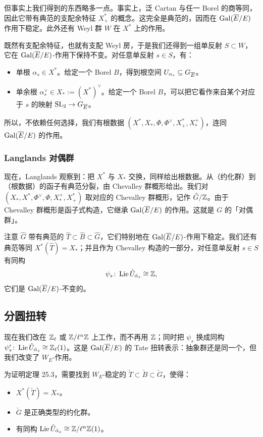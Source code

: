 但事实上我们得到的东西略多一点。事实上，泛 Cartan 与任一 Borel 的商等同，因此它带有典范的支配余特征 $X^*_+$ 的概念。这完全是典范的，因而在 $\operatorname{Gal}(\overline{E}/E)$ 作用下稳定。此外还有 Weyl 群 $W$ 在 $X^*$ 上的作用。

既然有支配余特征，也就有支配 Weyl 房，于是我们还得到一组单反射 $S\subset W$，它在 $\operatorname{Gal}(\overline{E}/E)$-作用下保持不变。对任意单反射 $s\in S$，有：
\begin{itemize}
\item 单根 $\alpha_s\in X^*$。给定一个 Borel $B$，得到根空间 $U_{\alpha_s}\subseteq G_{\overline{E}}$。
\item 单余根 $\alpha_s^\vee\in X_*:=(X^*)^\vee$。给定一个 Borel $B$，可以把它看作来自某个对应于 $s$ 的映射 $\mathrm{SL}_2\to G_{\overline{E}}$。
\end{itemize}
所以，不依赖任何选择，我们有根数据 $(X^*,X_*,\Phi,\Phi^\vee,X^*_+,X^+_*)$，连同 $\operatorname{Gal}(\overline{E}/E)$ 的作用。

\subsubsection{Langlands 对偶群}

现在，Langlands 观察到：把 $X^*$ 与 $X_*$ 交换，同样给出根数据。从（约化群）到（根数据）的函子有典范分裂，由 Chevalley 群概形给出。我们对 $(X_*,X^*,\Phi^\vee,\Phi,X^+_*,X^*_+)$ 取对应的 Chevalley 群概形，记作 $\hat G/\mathbb{Z}$。由于 Chevalley 群概形是函子式构造，它继承 $\operatorname{Gal}(\overline{E}/E)$ 的作用。这就是 $G$ 的「对偶群」。

注意 $\hat G$ 带有典范的 $\hat T\subset\hat B\subset\hat G$，它们特别地在 $\operatorname{Gal}(\overline{E}/E)$-作用下稳定。我们还有典范等同 $X^*(\hat T)=X_*$；并且作为 Chevalley 构造的一部分，对任意单反射 $s\in S$ 有同构
\[
\psi_s\colon\operatorname{Lie}\hat U_{\check\alpha_s}\cong\mathbb{Z},
\]
它们是 $\operatorname{Gal}(\overline{E}/E)$-不变的。

\subsection{分圆扭转}

现在我们改在 $\mathbb{Z}_\ell$ 或 $\mathbb{Z}/\ell^n\mathbb{Z}$ 上工作，而不再用 $\mathbb{Z}$；同时把 $\psi_s$ 换成同构 $\psi'_s\colon\operatorname{Lie}\hat U_{\check\alpha_s}\cong\mathbb{Z}_\ell(1)$。这是 $\operatorname{Gal}(\overline{E}/E)$ 的 Tate 扭转表示：抽象群还是同一个，但我们改变了 $W_E$-作用。

为证明定理 25.3，需要找到 $W_E$-稳定的 $\check T\subset\check B\subset\check G$，使得：
\begin{itemize}
\item $X^*(\check T)=X_*$。
\item $\check G$ 是正确类型的约化群。
\item 有同构 $\operatorname{Lie}\check U_{\check\alpha_s}\cong\mathbb{Z}/\ell^n\mathbb{Z}(1)$。
\end{itemize}


